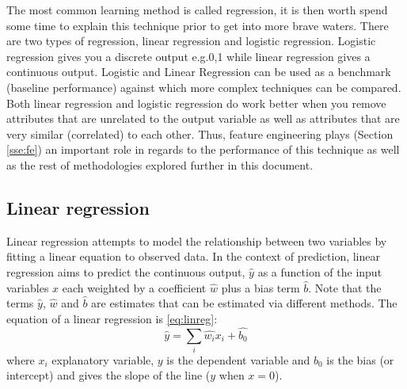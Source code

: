 \documentclass[11pt]{article}
\theoremstyle{definition}
\theoremstyle{remark}
\begin{document}
{The most common learning method is called regression, it is then worth spend some time to explain this technique prior to get into more brave waters. 
There are two types of regression, linear regression and logistic regression. Logistic regression gives you a discrete output e.g.0,1 while linear regression gives a continuous output. Logistic and Linear Regression can be used as a benchmark (baseline performance) against which more complex techniques can be compared. 
Both linear regression and logistic regression do work better when you remove attributes that are unrelated to the output variable as well as attributes that are very similar (correlated) to each other. Thus, feature engineering plays (Section \ref{sse:fe}) an important role in regards to the performance of this technique as well as the rest of methodologies explored further in this document.

\subsection{Linear regression}
\label{sse:linreg}

Linear regression attempts to model the relationship between two variables by fitting a linear equation to observed data. In the context of prediction, linear regression aims to predict the continuous output, $\hat{y}$ as a function of the input variables $x$ each weighted by a coefficient $\hat{w}$ plus a bias term $\hat{b}$. Note that the terms $\hat{y}$, $\hat{w}$ and $\hat{b}$ are estimates that can be estimated via different methods. The equation of a linear regression is \ref{eq:linreg}:
\begin{equation}
\hat{y} = \sum_i \hat{w_i}x_i + \hat{b_0}
\label{eq:linreg}
\end{equation}
where $x_i$ explanatory variable, $y$ is the dependent variable and $b_0$ is the bias (or intercept) and gives the slope of the line ($y$ when $x=0$).

}
\end{document}
